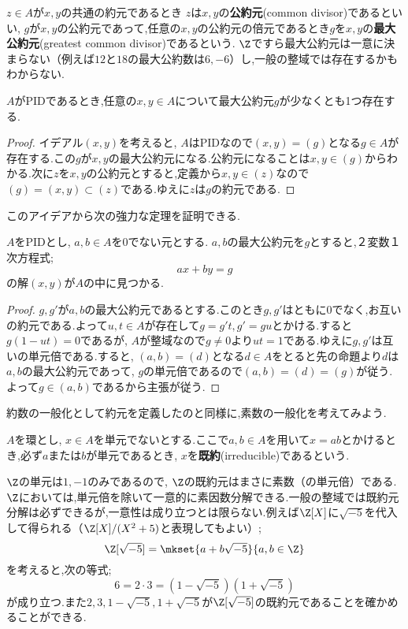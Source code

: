 $z\in A$が$x,y$の共通の約元であるとき $z$は$x,y$の\textbf{公約元}(common divisor)であるといい, $g$が$x,y$の公約元であって,任意の$x,y$の公約元の倍元であるとき$g$を$x,y$の\textbf{最大公約元}(greatest common divisor)であるという. $\Z$ですら最大公約元は一意に決まらない（例えば$12$と$18$の最大公約数は$6,-6$）し,一般の整域では存在するかもわからない.

\begin{prop}
	$A$がPIDであるとき,任意の$x,y\in A$について最大公約元$g$が少なくとも1つ存在する.
\end{prop}

\begin{proof}
	イデアル$(x,y)$を考えると, $A$はPIDなので$(x,y)=(g)$となる$g\in A$が存在する.この$g$が$x,y$の最大公約元になる.公約元になることは$x,y\in(g)$からわかる.次に$z$を$x,y$の公約元とすると,定義から$x,y\in (z)$なので$(g)=(x,y)\subset (z)$である.ゆえに$z$は$g$の約元である.
\end{proof}

このアイデアから次の強力な定理を証明できる.
\begin{thm}
	$A$をPIDとし, $a,b\in A$を0でない元とする. $a,b$の最大公約元を$g$とすると,２変数１次方程式;
	\[ax+by=g\]
	の解$(x,y)$が$A$の中に見つかる.
\end{thm}

\begin{proof}
	$g,g'$が$a,b$の最大公約元であるとする.このとき$g,g'$はともに0でなく,お互いの約元である.よって$u,t\in A$が存在して$g=g't,g'=gu$とかける.すると$g(1-ut)=0$であるが, $A$が整域なので$g\neq0$より$ut=1$である.ゆえに$g,g'$は互いの単元倍である.すると, $(a,b)=(d)$となる$d\in A$をとると先の命題より$d$は$a,b$の最大公約元であって, $g$の単元倍であるので$(a,b)=(d)=(g)$が従う.よって$g\in (a,b)$であるから主張が従う.
\end{proof}

約数の一般化として約元を定義したのと同様に,素数の一般化を考えてみよう.

\begin{defi}[既約元]\label{defi:既約元}
	$A$を環とし, $x\in A$を単元でないとする.ここで$a,b\in A$を用いて$x=ab$とかけるとき,必ず$a$または$b$が単元であるとき, $x$を\textbf{既約}(irreducible)であるという.
\end{defi}

$\Z$の単元は$1,-1$のみであるので, $\Z$の既約元はまさに素数（の単元倍）である. $\Z$においては,単元倍を除いて一意的に素因数分解できる.一般の整域では既約元分解は必ずできるが,一意性は成り立つとは限らない.例えば$\Z[X]$に$\sqrt{-5}$を代入して得られる（$\Z[X]/(X^2+5)$と表現してもよい）;
\[\Z[\sqrt{-5}]=\mkset{a+b\sqrt{-5}}{a,b\in\Z}\]
を考えると,次の等式;
\[6=2\cdot 3=(1-\sqrt{-5})(1+\sqrt{-5})\]
が成り立つ.また$2,3,1-\sqrt{-5},1+\sqrt{-5}$が$\Z[\sqrt{-5}]$の既約元であることを確かめることができる.

